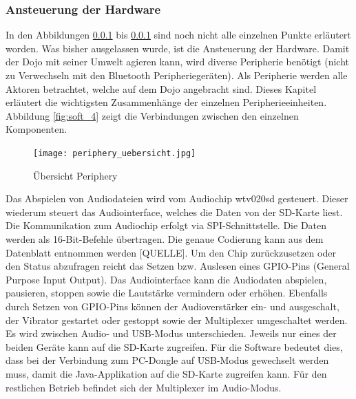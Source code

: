 \subsubsection{Ansteuerung der Hardware }
In den Abbildungen \ref{} bis \ref{} sind noch nicht alle einzelnen Punkte erläutert worden. Was bisher ausgelassen wurde, ist die Ansteuerung der Hardware. Damit der Dojo mit seiner Umwelt agieren kann, wird diverse Peripherie benötigt (nicht zu Verwechseln mit den Bluetooth Peripheriegeräten). Als Peripherie werden alle Aktoren betrachtet, welche auf dem Dojo angebracht sind. Dieses Kapitel erläutert die wichtigsten Zusammenhänge der einzelnen Peripherieeinheiten. Abbildung \ref{fig:soft_4} zeigt die Verbindungen zwischen den einzelnen Komponenten.
\begin{figure}[htb]
\begin{center}
\texttt{[image: periphery\_uebersicht.jpg]}
\caption{Übersicht Periphery} %
\label{fig:p_uebersicht}
\end{center}
\end{figure}
Das Abspielen von Audiodateien wird vom Audiochip wtv020sd gesteuert. Dieser wiederum steuert das Audiointerface, welches die Daten von der SD-Karte liest. Die Kommunikation zum Audiochip erfolgt via SPI-Schnittstelle. Die Daten werden als 16-Bit-Befehle übertragen. Die genaue Codierung kann aus dem Datenblatt entnommen werden [QUELLE]. Um den Chip zurückzusetzen oder den Status abzufragen reicht das Setzen bzw. Auslesen eines GPIO-Pins (General Purpose Input Output). Das Audiointerface kann die Audiodaten abspielen, pausieren, stoppen sowie die Lautstärke vermindern oder erhöhen. 
Ebenfalls durch Setzen von GPIO-Pins können der Audioverstärker ein- und ausgeschalt, der Vibrator gestartet oder gestoppt sowie der Multiplexer umgeschaltet werden. Es wird zwischen Audio- und USB-Modus unterschieden. Jeweils nur eines der beiden Geräte kann auf die SD-Karte zugreifen. Für die Software bedeutet dies, dass bei der Verbindung zum PC-Dongle auf USB-Modus gewechselt werden muss, damit die Java-Applikation auf die SD-Karte zugreifen kann. Für den restlichen Betrieb befindet sich der Multiplexer im Audio-Modus.
